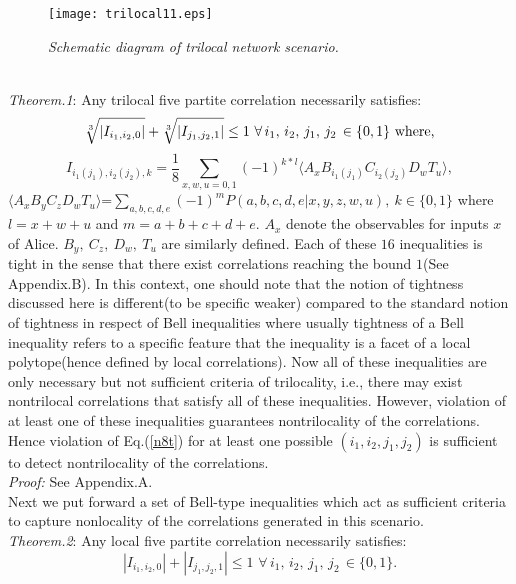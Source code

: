 \documentclass[pra,10pt,twocolumn,superscriptaddress,floatfix,showpacs]{revtex4-1}
\begin{document}
\begin{figure}[htb]
\texttt{[image: trilocal11.eps]}\\
\caption{\emph{Schematic diagram of trilocal network scenario.}}
\end{figure}
\\
\textit{Theorem.1}: Any trilocal five partite correlation necessarily satisfies:
\begin{equation}\label{n8t}
    \sqrt[3]{|I_{i_1,i_2,0}|}+\sqrt[3]{|I_{j_1,j_2,1}|}\leq1\,\,\forall\,i_1,\,i_2,\,j_1,\,j_2\,\in\{0,1\}\,\,\textmd{where,}
\end{equation}
\begin{equation}\label{n9t}
I_{i_1(j_1),i_2(j_2),k}=\frac{1}{8}\sum \limits_{x, w,u=0,1}(-1)^{k*l}\langle A_x B_{i_1(j_1)} C_{i_2(j_2)} D_w T_u\rangle,
\end{equation}
$ \langle A_x B_yC_z D_w T_u\rangle$=$\sum\limits_{a, b, c,d,e}(-1)^{m}P(a,b, c,d,e|x, y,z,w,u),~ k\in\{0,1\}$ where $l=x+w+u$ and $m=a+b+c+d+e$. $A_x$ denote the observables for inputs $x$ of Alice. $B_y,~ C_z, ~ D_w,~T_u$ are similarly defined. Each of these $16$ inequalities is tight in the sense that there exist correlations reaching the bound $1$(See Appendix.B). In this context, one should note that the notion of tightness discussed here is different(to be specific weaker) compared to the standard notion of tightness in respect of Bell inequalities where usually tightness of a Bell inequality refers to a specific feature that the inequality is a facet of a local polytope(hence defined by local correlations). Now all of these inequalities are only necessary but not sufficient criteria of trilocality, i.e., there may exist nontrilocal correlations that satisfy all of these inequalities. However, violation of at least one of these inequalities guarantees nontrilocality of the correlations. Hence violation of Eq.(\ref{n8t}) for at least one possible $(i_1,i_2,j_1,j_2)$ is sufficient to detect nontrilocality of the  correlations.\\
\textit{Proof:} See Appendix.A.\\
 Next we put forward a set of Bell-type inequalities which act as sufficient criteria to capture nonlocality of the correlations generated in this scenario.\\
\textit{Theorem.2}: Any local five partite correlation necessarily satisfies:
\begin{equation}\label{n8}
  |I_{i_1,i_2,0}|+|I_{j_1,j_2,1}|\leq1\,\,\forall\,i_1,\,i_2,\,j_1,\,j_2\,\in\{0,1\}.
\end{equation}
\end{document}
